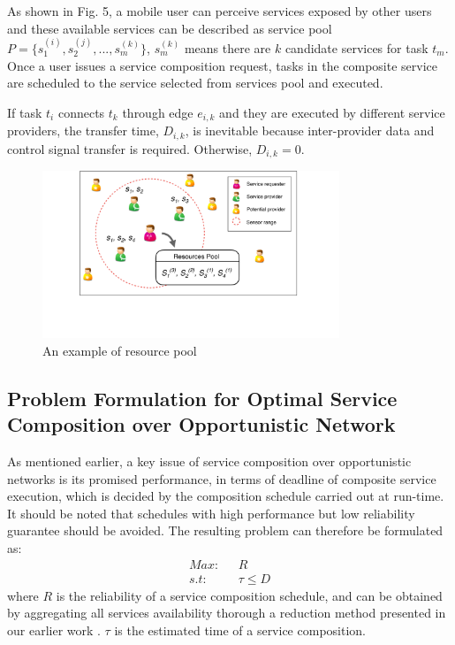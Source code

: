 \documentclass[journal]{IEEEtran}
\begin{document}
As shown in Fig. 5, a mobile user can perceive services exposed by other users and these available services can be described as service pool $P = \{s_1^{(i)}, s_2^{(j)}, ..., s_m^{(k)} \}$, $s_m^{(k)}$ means there are $k$ candidate services for task $t_m$. 
Once a user issues a service composition request, tasks in the composite service are scheduled to the service selected from services pool and executed.

If task $t_i$ connects $t_k$ through edge $e_{i,k}$ and they are executed by different service providers, the transfer time, $D_{i,k}$, is inevitable because inter-provider data and control signal transfer is required. Otherwise, $D_{i,k} = 0$.

\begin{figure}[!t]
\centering
\includegraphics[width=3.5in]{./img/pic5.pdf}
\caption{An example of resource pool}
\label{Resource Pool}
\end{figure}

\subsection{Problem Formulation for Optimal Service Composition over Opportunistic Network}

As mentioned earlier, a key issue of service composition over opportunistic networks is its promised performance, in terms of deadline of composite service execution, which is decided by the composition schedule carried out at run-time. It should be noted that schedules with high performance but low reliability guarantee should be avoided. The resulting problem can therefore be formulated as:
\begin{align}
Max    : \ \ \ & R   \\\nonumber
s.t    : \ \ \ & \tau \le D
\end{align}
where $R$ is the reliability of a service composition schedule, and can be obtained by aggregating all services availability thorough a reduction method presented in our earlier work \cite{xia2009novel}. $\tau$ is the estimated time of a service composition. 
\end{document}
